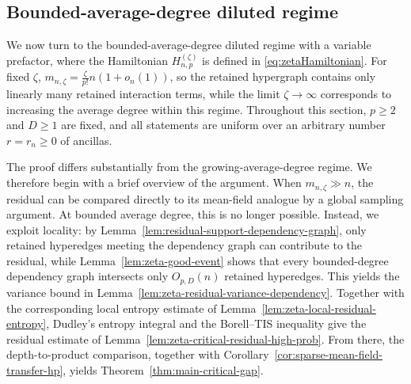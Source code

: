 \documentclass[12pt]{article}
\begin{document}
\subsection{Bounded-average-degree diluted regime}
\label{ssec:bounded-average-degree-diluted-model}
We now turn to the bounded-average-degree diluted regime with a variable
prefactor, where the Hamiltonian \(H_{n,p}^{(\zeta)}\) is defined in
\eqref{eq:zetaHamiltonian}. For fixed \(\zeta\), $m_{n,\zeta}
=
\frac{\zeta}{p!}n(1+o_n(1))$, so the retained hypergraph contains only linearly many retained interaction terms, while the limit \(\zeta\to\infty\) corresponds to increasing the average degree within this regime.
Throughout this section, \(p\ge2\) and
\(D\ge1\) are fixed, and all statements are uniform over an arbitrary number
\(r=r_n\ge0\) of ancillas.

The proof differs substantially from the growing-average-degree regime. We therefore begin with a brief overview of the argument.
When \(m_{n,\zeta} \gg n\), the residual can be compared directly to its
mean-field analogue by a global sampling argument. At bounded average degree, this is no longer possible. Instead, we exploit locality: by
Lemma~\ref{lem:residual-support-dependency-graph}, only retained hyperedges
meeting the dependency graph can contribute to the residual, while
Lemma~\ref{lem:zeta-good-event} shows that every bounded-degree dependency graph
intersects only \(O_{p,D}(n)\) retained hyperedges. This yields the variance
bound in Lemma~\ref{lem:zeta-residual-variance-dependency}. Together with the
corresponding local entropy estimate of
Lemma~\ref{lem:zeta-local-residual-entropy}, Dudley's entropy integral and the
Borell--TIS inequality give the residual estimate of
Lemma~\ref{lem:zeta-critical-residual-high-prob}. From there, the depth-to-product comparison, together with
Corollary~\ref{cor:sparse-mean-field-transfer-hp}, yields
Theorem~\ref{thm:main-critical-gap}.
\end{document}
